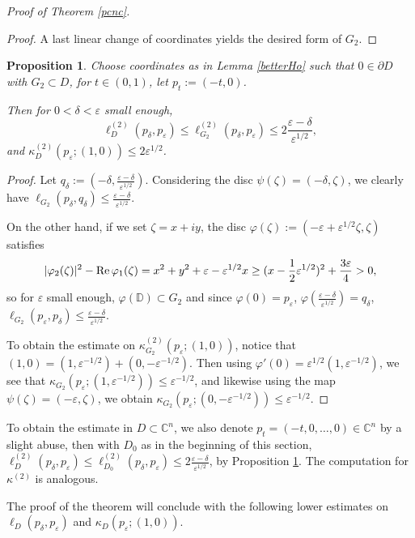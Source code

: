 \documentclass[a4paper,12pt]{amsart}
\def\D{\mathbb D}
\def\C{\mathbb C}
\newtheorem{prop}[thm]{Proposition}
\renewcommand{\Re}{\operatorname{\rm{Re}}}
\newcommand{\eps}{\varepsilon}
\newenvironment{proof*}{\vskip 2mm\noindent {}}{\hfill $\Box$ \vskip 2mm}
\begin{document}
\begin{proof*}{\it Proof of Theorem \ref{pcnc}.}
\begin{proof}
A last linear change of coordinates yields the desired form of $G_2$.
\end{proof}


\begin{prop}
\label{upbd}
Choose coordinates as in Lemma \ref{betterHo} such that $0\in 
\partial D$ with $G_2\subset D$,
for $t \in (0,1)$, let $p_t := (-t,0)$. 

Then for $0< \delta < \eps$ small enough,
\[
\ell_{D}^{(2)}(p_\delta, p_\eps) \le\ell_{G_2}^{(2)}(p_\delta, p_\eps) \le 2 \frac{\eps-\delta}{\eps^{1/2}},
\]
and $\kappa^{(2)}_D (p_\eps; (1,0)) \le 2 \eps^{1/2}$.
\end{prop}
\begin{proof}
Let $q_\delta:= (-\delta, \frac{\eps-\delta}{\eps^{1/2}})$. Considering the disc $\psi (\zeta)= (-\delta,\zeta)$,
we clearly have $\ell_{G_2}(p_\delta,q_\delta) \le \frac{\eps-\delta}{\eps^{1/2}}$.

On the other hand, if we set $\zeta=x+iy$, the disc $\varphi(\zeta):= (-\eps+\eps^{1/2}\zeta, \zeta)$  satisfies
\[
|\varphi_2(\zeta)|^2 - \Re \varphi_1(\zeta) =
x^2+y^2 +\eps -\eps^{1/2} x \ge (x-\frac12 \eps^{1/2})^2 + \frac{3\eps}4 >0,
\]
so for $\eps$ small enough, $\varphi(\D)\subset G_2$ and since $\varphi (0)=p_\eps$,
$\varphi (\frac{\eps-\delta}{\eps^{1/2}})= q_\delta$,
$\ell_{G_2}(p_\eps,p_\delta) \le \frac{\eps-\delta}{\eps^{1/2}}$.

To obtain the estimate on  $\kappa^{(2)}_{G_2} (p_\eps; (1,0))$, notice
that $(1,0)= (1, \eps^{-1/2})+(0, -\eps^{-1/2})$. Then using 
$\varphi'(0)=\eps^{1/2}(1, \eps^{-1/2})$,
we see that $\kappa_{G_2} (p_\eps; (1, \eps^{-1/2})) \le \eps^{-1/2}$,
and likewise using the map $\psi (\zeta)= (-\eps,\zeta)$, we obtain
$\kappa_{G_2} (p_\eps; (0, -\eps^{-1/2})) \le \eps^{-1/2}$.
\end{proof}

To obtain the estimate in $D\subset \C^n$, we also denote $p_t=(-t,0, \dots, 0) \in \C^n$ by a slight abuse, then with $D_0$
as in the beginning of this section, 
$\ell_{D}^{(2)}(p_\delta, p_\eps) \le\ell_{D_0}^{(2)}(p_\delta, p_\eps)\le 2 \frac{\eps-\delta}{\eps^{1/2}}$, by 
Proposition \ref{upbd}. The computation for  $\kappa^{(2)}$ is analogous.


The proof of the theorem will conclude with the following lower estimates on $\ell_D(p_\delta,p_\eps)$ and $\kappa_D (p_\eps; (1,0))$.
\end{proof*}
\end{document}
